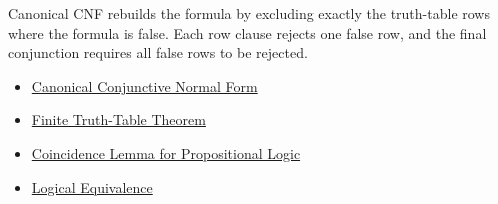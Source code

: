 \begin{remark*}[Interpretation]
Canonical CNF rebuilds the formula by excluding exactly the truth-table rows
where the formula is false. Each row clause rejects one false row, and the
final conjunction requires all false rows to be rejected.
\end{remark*}

\begin{dependencies}
\begin{itemize}
  \item \hyperref[def:canonical-conjunctive-normal-form-propositional-logic]{Canonical Conjunctive Normal Form}
  \item \hyperref[thm:finite-truth-table-propositional-logic]{Finite Truth-Table Theorem}
  \item \hyperref[lem:coincidence-lemma-propositional-logic]{Coincidence Lemma for Propositional Logic}
  \item \hyperref[def:logical-equivalence-propositional-logic]{Logical Equivalence}
\end{itemize}
\end{dependencies}
